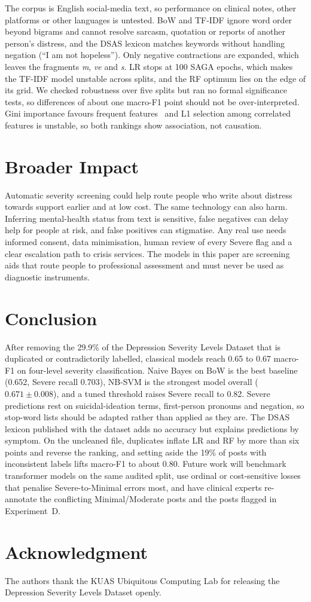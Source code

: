 \documentclass[conference]{IEEEtran}
\begin{document}
The corpus is English social-media text, so performance on clinical notes, other platforms or other languages is untested. BoW and TF-IDF ignore word order beyond bigrams and cannot resolve sarcasm, quotation or reports of another person's distress, and the DSAS lexicon matches keywords without handling negation (``I am not hopeless''). Only negative contractions are expanded, which leaves the fragments \textit{m}, \textit{ve} and \textit{s}. LR stops at 100 SAGA epochs, which makes the TF-IDF model unstable across splits, and the RF optimum lies on the edge of its grid. We checked robustness over five splits but ran no formal significance tests, so differences of about one macro-F1 point should not be over-interpreted. Gini importance favours frequent features~\cite{strobl2007bias} and L1 selection among correlated features is unstable, so both rankings show association, not causation.

\section{Broader Impact}

Automatic severity screening could help route people who write about distress towards support earlier and at low cost. The same technology can also harm. Inferring mental-health status from text is sensitive, false negatives can delay help for people at risk, and false positives can stigmatise. Any real use needs informed consent, data minimisation, human review of every Severe flag and a clear escalation path to crisis services. The models in this paper are screening aids that route people to professional assessment and must never be used as diagnostic instruments.

\section{Conclusion}

After removing the 29.9\% of the Depression Severity Levels Dataset that is duplicated or contradictorily labelled, classical models reach 0.65 to 0.67 macro-F1 on four-level severity classification. Naive Bayes on BoW is the best baseline (0.652, Severe recall 0.703), NB-SVM is the strongest model overall ($0.671\pm0.008$), and a tuned threshold raises Severe recall to 0.82. Severe predictions rest on suicidal-ideation terms, first-person pronouns and negation, so stop-word lists should be adapted rather than applied as they are. The DSAS lexicon published with the dataset adds no accuracy but explains predictions by symptom. On the uncleaned file, duplicates inflate LR and RF by more than six points and reverse the ranking, and setting aside the 19\% of posts with inconsistent labels lifts macro-F1 to about 0.80. Future work will benchmark transformer models on the same audited split, use ordinal or cost-sensitive losses that penalise Severe-to-Minimal errors most, and have clinical experts re-annotate the conflicting Minimal/Moderate posts and the posts flagged in Experiment~D.

\section*{Acknowledgment}
The authors thank the KUAS Ubiquitous Computing Lab for releasing the Depression Severity Levels Dataset openly.



\end{document}

